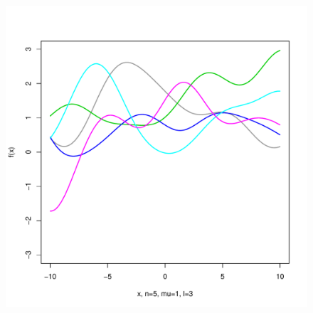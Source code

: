 \documentclass[12pt,letterpaper]{article}
\begin{document}
\begin{figure}
\begin{center}
\includegraphics[scale=0.2]{hw321/n5-m1-l3.pdf}
\end{center}
\end{figure}
\end{document}
